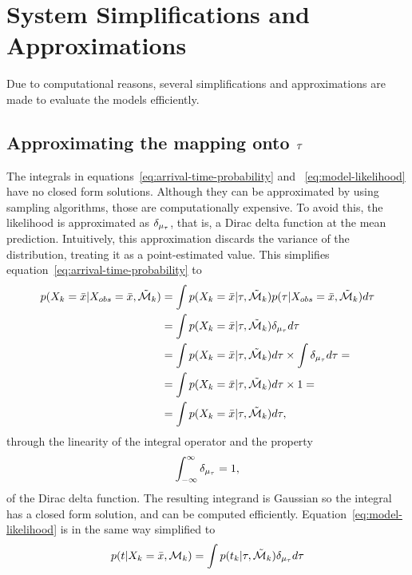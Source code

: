 \section{System Simplifications and Approximations}
Due to computational reasons, several simplifications and
approximations are made to evaluate the models efficiently.

\subsection{Approximating the mapping onto $\tau$}
The integrals in equations~\ref{eq:arrival-time-probability} and
~\ref{eq:model-likelihood} have no closed form solutions.
Although they can be approximated by using sampling algorithms,
those are computationally expensive. To
avoid this, the likelihood is approximated as
$\delta_{\mu_{\tau}}$, that is, a Dirac delta function at the
mean prediction. Intuitively, this approximation discards the variance
of the distribution, treating it as a point-estimated value.
This simplifies equation~\ref{eq:arrival-time-probability} to
\begin{equation}
  \begin{split}
    p(X_{k} = \bar{x} \vert X_{obs} = \bar{x},
    \tilde{\mathcal{M}}_{k}) & = 
    \int p(X_{k} = \bar{x} \vert \tau, \tilde{\mathcal{M}}_{k}) 
    p(\tau \vert X_{obs} = \bar{x},
    \tilde{\mathcal{M}}_{k}) d\tau \\
    & = \int p(X_{k} = \bar{x} \vert \tau, \tilde{\mathcal{M}}_{k}) 
    \delta_{\mu_{\tau}} d\tau \\
    & = \int p(X_{k} = \bar{x} \vert \tau, \tilde{\mathcal{M}}_{k}) d\tau
    \times \int \delta_{\mu_{\tau}} d\tau = \\
    & = \int p(X_{k} = \bar{x} \vert \tau,
    \tilde{\mathcal{M}}_{k}) d\tau \times 1 = \\
    & = \int p(X_{k} = \bar{x} \vert \tau,
    \tilde{\mathcal{M}}_{k}) d\tau,
  \end{split}
\end{equation}
through the linearity of the integral operator and the property
\begin{equation}
  \label{eq:dirac-integral}
  \int_{-\infty}^{\infty} \delta_{\mu_{\tau}} = 1,
\end{equation}
of the Dirac delta function. The resulting integrand is Gaussian
so the integral has a closed form solution, and can be computed
efficiently. Equation~\ref{eq:model-likelihood} is in the same way
simplified to
\begin{equation}
  \begin{split}
    p(t \vert X_k = \bar{x}, \mathcal{M}_{k}) =
    \int p(t_k | \tau, \tilde{\mathcal{M}}_k) \delta_{\mu_{\tau}} d\tau
  \end{split}
\end{equation}

